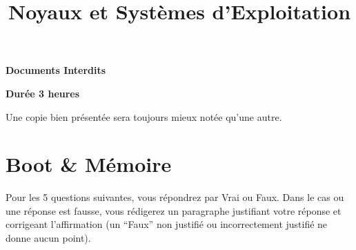 %
%
%
%
%
%

%
%

%
%

\def\path{../../..}

%
%



%
%

\title{Noyaux et Syst\`emes d'Exploitation}

%
%

\rhead{}

%
%



%
%

\maketitle

%
%

\indentation{}

%
%

\begin{center}

\textbf{Documents Interdits}

\textbf{Dur\'ee 3 heures}

\scriptsize{Une copie bien pr\'esent\'ee sera toujours mieux not\'ee
            qu'une autre.}

\end{center}

%
%

%
%

\section{Boot \& M\'emoire
         {\hfill{} }}

Pour les 5 questions suivantes, vous r\'epondrez par Vrai ou Faux. Dans le cas ou une r\'eponse est fausse, vous r\'edigerez un paragraphe justifiant votre r\'eponse et corrigeant l'affirmation (un ``Faux'' non justifi\'e ou incorrectement justifi\'e ne donne aucun point).

